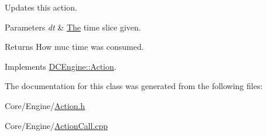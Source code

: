 Updates this action. 


\begin{DoxyParams}{Parameters}
{\em dt} & \hyperlink{classThe}{The} time slice given. \\
\hline
\end{DoxyParams}
\begin{DoxyReturn}{Returns}
How muc time was consumed. 
\end{DoxyReturn}


Implements \hyperlink{classDCEngine_1_1Action}{D\-C\-Engine\-::\-Action}.



The documentation for this class was generated from the following files\-:\begin{DoxyCompactItemize}
\item 
Core/\-Engine/\hyperlink{Action_8h}{Action.\-h}\item 
Core/\-Engine/\hyperlink{ActionCall_8cpp}{Action\-Call.\-cpp}\end{DoxyCompactItemize}
